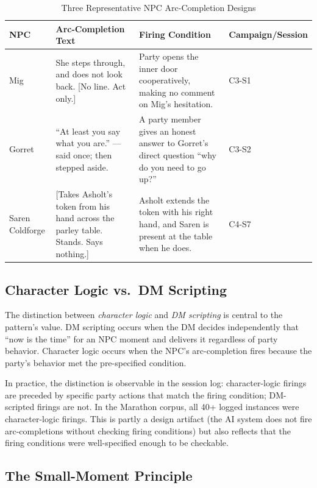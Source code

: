 \begin{table}[t]
\caption{Three Representative NPC Arc-Completion Designs}
\label{tab:examples}
\begin{tabular}{@{}lp{4cm}p{4cm}p{3cm}@{}}
\toprule
NPC & Arc-Completion Text & Firing Condition & Campaign/Session \\
\midrule
Mig & She steps through, and does not look back. [No line. Act only.] & Party opens the inner door cooperatively, making no comment on Mig's hesitation. & C3-S1 \\
Gorret & ``At least you say what you are.'' --- said once; then stepped aside. & A party member gives an honest answer to Gorret's direct question ``why do you need to go up?'' & C3-S2 \\
Saren Coldforge & [Takes Asholt's token from his hand across the parley table. Stands. Says nothing.] & Asholt extends the token with his right hand, and Saren is present at the table when he does. & C4-S7 \\
\bottomrule
\end{tabular}
\end{table}

\subsection{Character Logic vs.\ DM Scripting}

The distinction between \textit{character logic} and \textit{DM scripting} is central
to the pattern's value. DM scripting occurs when the DM decides independently that
``now is the time'' for an NPC moment and delivers it regardless of party behavior.
Character logic occurs when the NPC's arc-completion fires because the party's behavior
met the pre-specified condition.

In practice, the distinction is observable in the session log: character-logic firings
are preceded by specific party actions that match the firing condition; DM-scripted
firings are not. In the Marathon corpus, all 40+ logged instances were character-logic
firings. This is partly a design artifact (the AI system does not fire arc-completions
without checking firing conditions) but also reflects that the firing conditions were
well-specified enough to be checkable.

\subsection{The Small-Moment Principle}


